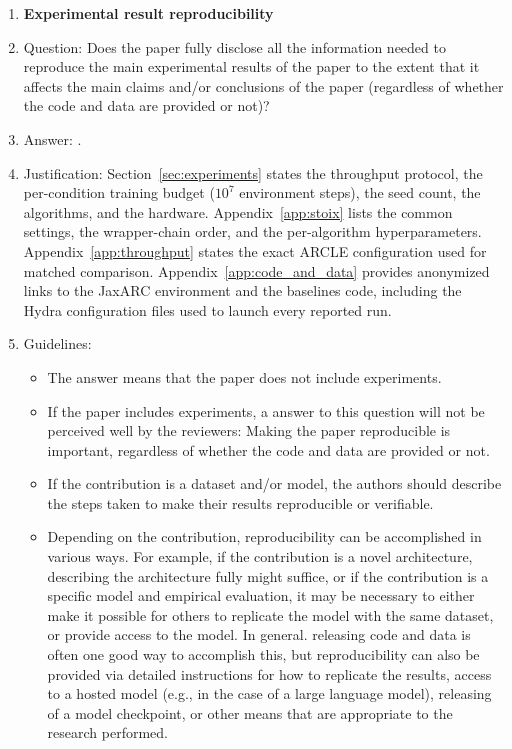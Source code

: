 \begin{enumerate}
\item {\bf Experimental result reproducibility}
    \item[] Question: Does the paper fully disclose all the information needed to reproduce the main experimental results of the paper to the extent that it affects the main claims and/or conclusions of the paper (regardless of whether the code and data are provided or not)?
    \item[] Answer: \answerYes{}.
    \item[] Justification: Section~\ref{sec:experiments} states the throughput protocol, the per-condition training budget ($10^7$ environment steps), the seed count, the algorithms, and the hardware. Appendix~\ref{app:stoix} lists the common settings, the wrapper-chain order, and the per-algorithm hyperparameters. Appendix~\ref{app:throughput} states the exact ARCLE configuration used for matched comparison. Appendix~\ref{app:code_and_data} provides anonymized links to the JaxARC environment and the baselines code, including the Hydra configuration files used to launch every reported run.
    \item[] Guidelines:
    \begin{itemize}
        \item The answer \answerNA{} means that the paper does not include experiments.
        \item If the paper includes experiments, a \answerNo{} answer to this question will not be perceived well by the reviewers: Making the paper reproducible is important, regardless of whether the code and data are provided or not.
        \item If the contribution is a dataset and\slash or model, the authors should describe the steps taken to make their results reproducible or verifiable. 
        \item Depending on the contribution, reproducibility can be accomplished in various ways. For example, if the contribution is a novel architecture, describing the architecture fully might suffice, or if the contribution is a specific model and empirical evaluation, it may be necessary to either make it possible for others to replicate the model with the same dataset, or provide access to the model. In general. releasing code and data is often one good way to accomplish this, but reproducibility can also be provided via detailed instructions for how to replicate the results, access to a hosted model (e.g., in the case of a large language model), releasing of a model checkpoint, or other means that are appropriate to the research performed.

\end{itemize}
\end{enumerate}
